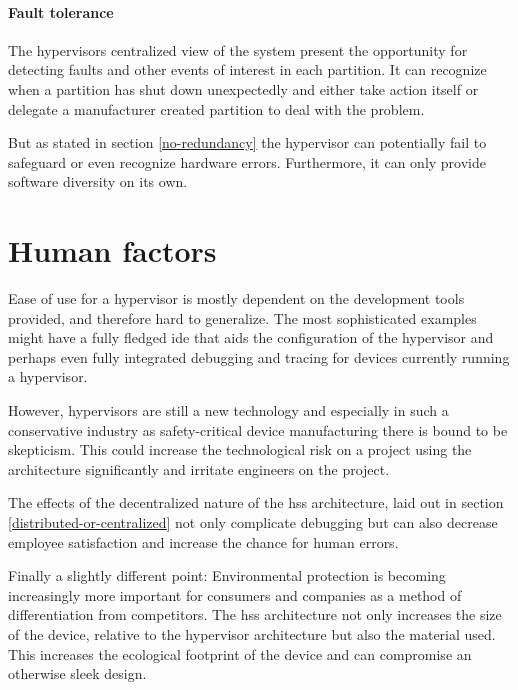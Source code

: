 \paragraph{Fault tolerance}
The hypervisors centralized view of the system present the opportunity for detecting faults and other events of interest in each partition. It can recognize when a partition has shut down unexpectedly and either take action itself or delegate a manufacturer created partition to deal with the problem.

But as stated in section \ref{no-redundancy} the hypervisor can potentially fail to safeguard or even recognize hardware errors. Furthermore, it can only provide software diversity on its own.


\section{Human factors}
Ease of use for a hypervisor is mostly dependent on the development tools provided, and therefore hard to generalize. The most sophisticated examples might have a fully fledged \acrshort{ide} that aids the configuration of the hypervisor and perhaps even fully integrated debugging and tracing for devices currently running a hypervisor. %

However, hypervisors are still a new technology and especially in such a conservative industry as safety-critical device manufacturing there is bound to be skepticism. This could increase the technological risk on a project using the architecture significantly and irritate engineers on the project.

The effects of the decentralized nature of the \acrshort{hss} architecture, laid out in section \ref{distributed-or-centralized} not only complicate debugging but can also decrease employee satisfaction and increase the chance for human errors.

Finally a slightly different point: Environmental protection is becoming increasingly more important for consumers and companies as a method of differentiation from competitors. The \acrshort{hss} architecture not only increases the size of the device, relative to the hypervisor architecture but also the material used. This increases the ecological footprint of the device and can compromise an otherwise sleek design.


